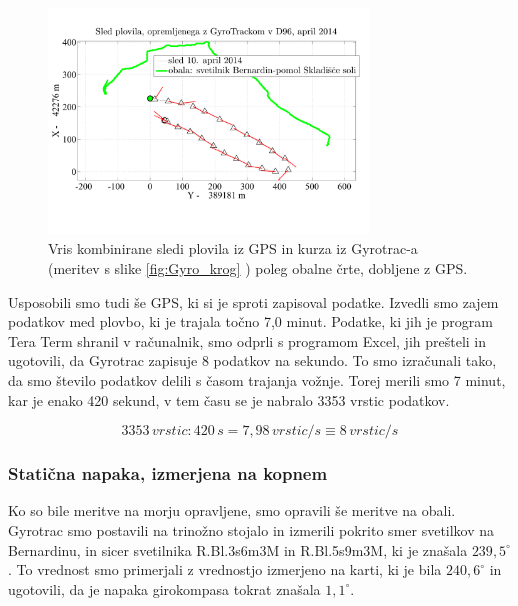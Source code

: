 \begin{figure}
	\centering
	\includegraphics[height=6cm]{Vaje/VzorecPoroc/figs/SledPlovilaZGyrotrackom_KurzSamoOdNmeaGps.pdf}
	\caption{Vris kombinirane sledi plovila iz GPS in kurza iz Gyrotrac-a (meritev s slike \ref{fig:Gyro_krog} ) poleg obalne črte, dobljene z GPS.}
	\label{fig:GyroGps_sled}       %
\end{figure}

Usposobili smo tudi še GPS, ki si je sproti zapisoval podatke. Izvedli smo zajem podatkov med plovbo, ki je trajala točno 7,0 minut. Podatke, ki jih je program Tera Term shranil v računalnik, smo odprli s programom Excel, jih prešteli in ugotovili, da Gyrotrac zapisuje 8 podatkov na sekundo. To smo izračunali tako, da smo število podatkov delili s časom trajanja vožnje. Torej merili smo 7 minut, kar je enako 420 sekund, v tem času se je nabralo 3353 vrstic podatkov.

$$ 3353\,vrstic : 420\,s = 7,98\,vrstic/s \equiv 8\,vrstic/s $$


\subsubsection{Statična napaka, izmerjena na kopnem}
Ko so bile meritve na morju opravljene, smo opravili še meritve na obali.  Gyrotrac smo postavili na trinožno stojalo in izmerili pokrito smer svetilkov na Bernardinu, in sicer svetilnika R.Bl.3s6m3M in R.Bl.5s9m3M, ki je znašala $239,5^{\circ}$. To vrednost smo primerjali z vrednostjo izmerjeno na karti, ki je bila $240,6^{\circ}$ in ugotovili, da je napaka girokompasa tokrat znašala $1,1^{\circ}$. 

